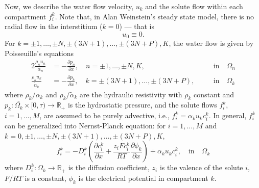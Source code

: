 \documentclass{article}
\begin{document}
Now, we describe the water flow velocity, $u_k$ and the solute flow within each compartment $f_i^k$.
Note that, in Alan Weinstein's steady state model, there is no radial flow in the interstitium ($k=0$) --- that is 
\begin{equation}
    u_0\equiv 0.
\end{equation}
For $k=\pm 1,\dots,\pm N,\pm(3N+1),\dots,\pm(3N+P),K$, 
the water flow is given by Poisseuille's equations
\begin{alignat}{2}
    \frac{\rho_nu_n}{\alpha_n} &= -\frac{\partial p_n}{\partial x},\quad n=\pm 1,\dots,\pm N, K, \quad &&\text{in}\quad \Omega_n\\
    \frac{\rho_ku_k}{\tilde{\alpha}_k} &= -\frac{\partial p_k}{\partial x},\quad k=\pm(3N+1),\dots,\pm(3N+P), \quad &&\text{in}\quad \Omega_k
\end{alignat}
where $\rho_k/\alpha_k$ and $\rho_k/\tilde{\alpha}_k$ are the hydraulic resistivity with $\rho_k$ constant and $p_k:\overline{\Omega_k}\times [0,\tau)\to \mathbb{R}_{+}$ is the hydrostatic pressure, and the solute flows $f_i^k$, $i=1,\dots,M$, are assumed to be purely advective, i.e., $f_i^k = \alpha_ku_kc_i^k$.
In general, $f_i^k$ can be generalized into Nernst-Planck equation: for $i=1,\dots,M$ and $k=0,\pm 1,\dots,\pm N,\pm(3N+1),\dots,\pm(3N+P),K$,
\begin{equation}
    f_i^k = -D_i^k\left( \frac{\partial c_i^k}{\partial x}+\frac{z_iFc_i^k}{RT} \frac{\partial\phi_k}{\partial x}\right) + \alpha_k u_kc_i^k,\quad \text{in}\quad \Omega_k
\end{equation}
where $D_i^k:\Omega_k\to \mathbb{R}_+$ is the diffusion coefficient, $z_i$ is the valence of the solute $i$, $F/RT$ is a constant, $\phi_k$ is the electrical potential in compartment $k$.
\end{document}
